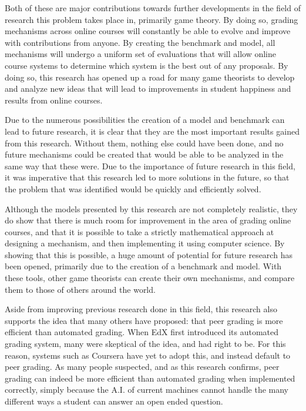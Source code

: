 \documentclass[12pt, Arial]{article}
\begin{document}
Both of these are major contributions towards further developments in the field of research this problem takes place in, primarily game theory. By doing so, grading mechanisms across online courses will constantly be able to evolve and improve with contributions from anyone. By creating the benchmark and model, all mechanisms will undergo a uniform set of evaluations that will allow online course systems to determine which system is the best out of any proposals. By doing so, this research has opened up a road for many game theorists to develop and analyze new ideas that will lead to improvements in student happiness and results from online courses.

Due to the numerous possibilities the creation of a model and benchmark can lead to future research, it is clear that they are the most important results gained from this research. Without them, nothing else could have been done, and no future mechanisms could be created that would be able to be analyzed in the same way that these were. Due to the importance of future research in this field, it was imperative that this research led to more solutions in the future, so that the problem that was identified would be quickly and efficiently solved.

Although the models presented by this research are not completely realistic, they do show that there is much room for improvement in the area of grading online courses, and that it is possible to take a strictly mathematical approach at designing a mechanism, and then implementing it using computer science. By showing that this is possible, a huge amount of potential for future research has been opened, primarily due to the creation of a benchmark and model. With these tools, other game theorists can create their own mechanisms, and compare them to those of others around the world.

Aside from improving previous research done in this field, this research also supports the idea that many others have proposed: that peer grading is more efficient than automated grading. When EdX first introduced its automated grading system, many were skeptical of the idea, and had right to be. For this reason, systems such as Coursera have yet to adopt this, and instead default to peer grading. As many people suspected, and as this research confirms, peer grading can indeed be more efficient than automated grading when implemented correctly, simply because the A.I. of current machines cannot handle the many different ways a student can answer an open ended question.
\end{document}
